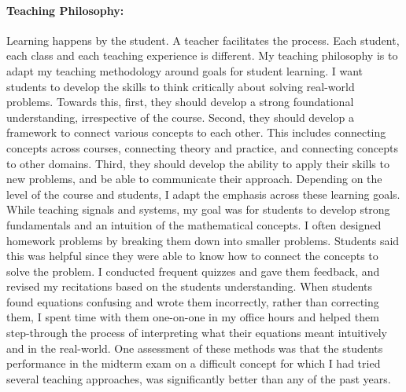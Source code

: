 \documentclass[10pt]{article}
\begin{document}
\paragraph{Teaching Philosophy: }
Learning happens by the student. A teacher facilitates the process.  Each student, each class and each teaching experience is different. My teaching philosophy is to adapt my teaching methodology around goals for student learning. 
I want students to develop the skills to think critically about solving real-world problems. 
Towards this, first, they should develop a strong foundational understanding, irrespective of the course. Second, they should develop a framework to connect various concepts to each other. This includes connecting concepts across courses, connecting theory and practice,  and connecting concepts to other domains. Third, they should develop the ability to apply their skills to new problems, and be able to communicate their approach. Depending on the level of the course and students, I adapt the emphasis across these learning goals.\\


While teaching signals and systems, my goal was for students to develop strong fundamentals and an intuition of the mathematical concepts.
I often designed homework problems by breaking them down into smaller problems. Students said this was helpful since they were able to know how to connect the concepts to solve the problem. 
I conducted frequent quizzes and gave them feedback, and revised my recitations based on the students understanding. 
When students found equations confusing and wrote them incorrectly, rather than correcting them, I spent time with them one-on-one in my office hours and helped them step-through the process of interpreting what their equations meant intuitively and in the real-world. %
One assessment of these methods was that the students performance in the midterm exam on a difficult concept for which I had tried several teaching approaches, was significantly better than any of the past years. \\
\end{document}
